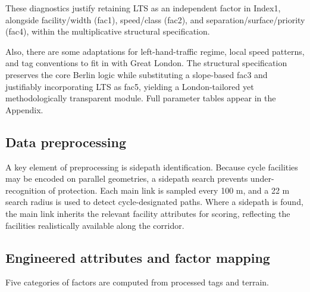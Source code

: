 \documentclass[
  12pt,
  oneside]{book}
\begin{document}
These diagnostics justify retaining LTS as an independent factor in Index1, alongside facility/width (fac1), speed/class (fac2), and separation/surface/priority (fac4), within the multiplicative structural specification.

Also, there are some adaptations for left-hand-traffic regime, local speed patterns, and tag conventions to fit in with Great London.
The structural specification preserves the core Berlin logic while substituting a slope-based fac3 and justifiably incorporating LTS as fac5, yielding a London-tailored yet methodologically transparent module. Full parameter tables appear in the Appendix.

\subsection{Data preprocessing}\label{data-preprocessing}

A key element of preprocessing is sidepath identification. Because cycle facilities may be encoded on parallel geometries, a sidepath search prevents under-recognition of protection. Each main link is sampled every 100 m, and a 22 m search radius is used to detect cycle-designated paths. Where a sidepath is found, the main link inherits the relevant facility attributes for scoring, reflecting the facilities realistically available along the corridor.

\subsection{Engineered attributes and factor mapping}\label{engineered-attributes-and-factor-mapping}

Five categories of factors are computed from processed tags and terrain.
\end{document}
